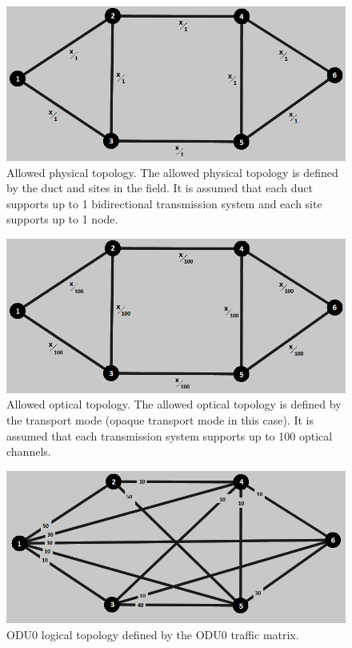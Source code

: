 \begin{figure}[H]
\centering
\includegraphics[width=13cm]{sdf/heuristic/opaque_protection/medium/allowed_physical_medium}
\caption{Allowed physical topology. The allowed physical topology is defined by the duct and sites in the field. It is assumed that each duct supports up to 1 bidirectional transmission system and each site supports up to 1 node.}
\label{allowed_physical_protec_ref_medium_heuristic}
\end{figure}

\begin{figure}[H]
\centering
\includegraphics[width=13cm]{sdf/heuristic/opaque_protection/medium/allowed_optical_medium}
\caption{Allowed optical topology. The allowed optical topology is defined by the transport mode (opaque transport mode in this case). It is assumed that each transmission system supports up to 100 optical channels.}
\label{allowed_optical_protec_ref_medium_heuristic}
\end{figure}

\begin{figure}[H]
\centering
\includegraphics[width=13cm]{sdf/heuristic/opaque_protection/medium/logical_topology_odu0_medium}
\caption{ODU0 logical topology defined by the ODU0 traffic matrix.}
\label{logical_ODU0_protec_ref_medium_heuristic}
\end{figure}

